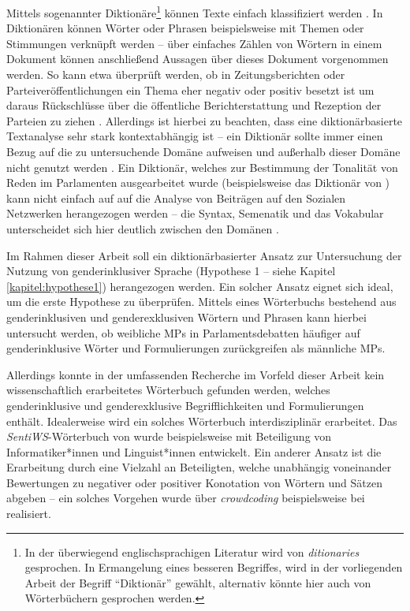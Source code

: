 \documentclass[12pt, 
    twoside=false, 
    bibliography=totoc, 
    numbers=endperiod, 
    headings=normal, 
    toc=chapterentrydotfill
    ]{scrbook}
\begin{document}
Mittels sogenannter Diktionäre\footnote{In der überwiegend englischsprachigen Literatur wird von \emph{ditionaries} gesprochen. In Ermangelung eines besseren Begriffes, wird in der vorliegenden Arbeit der Begriff \enquote{Diktionär} gewählt, alternativ könnte hier auch von Wörterbüchern gesprochen werden.} können Texte einfach klassifiziert werden \parencites[274]{grimmer_2013}[166]{brosius_2012}. In Diktionären können Wörter oder Phrasen beispielsweise mit Themen oder Stimmungen verknüpft werden -- über einfaches Zählen von Wörtern in einem Dokument können anschließend Aussagen über dieses Dokument vorgenommen werden.
So kann etwa überprüft werden, ob in Zeitungsberichten oder Parteiveröffentlichungen ein Thema eher negativ oder positiv besetzt ist um daraus Rückschlüsse über die öffentliche Berichterstattung und Rezeption der Parteien zu ziehen \parencites[vgl.][]{haselmayer_2017}[vgl.][]{backfried_2016}. Allerdings ist hierbei zu beachten, dass eine diktionärbasierte Textanalyse sehr stark kontextabhängig ist -- ein Diktionär sollte immer einen Bezug auf die zu untersuchende Domäne aufweisen und außerhalb dieser Domäne nicht genutzt werden \parencite[268]{grimmer_2013}. Ein Diktionär, welches zur Bestimmung der Tonalität von Reden im Parlamenten ausgearbeitet wurde (beispielsweise das Diktionär von \textcite{haselmayer_2017}) kann nicht einfach auf auf die Analyse von Beiträgen auf den Sozialen Netzwerken herangezogen werden -- die Syntax, Semenatik und das Vokabular unterscheidet sich hier deutlich zwischen den Domänen \parencite[vgl.][534f.]{wilkerson_2017}.

Im Rahmen dieser Arbeit soll ein diktionärbasierter Ansatz zur Untersuchung der Nutzung von genderinklusiver Sprache (Hypothese 1 -- siehe Kapitel \ref{kapitel:hypothese1}) herangezogen werden. Ein solcher Ansatz eignet sich ideal, um die erste Hypothese zu überprüfen. Mittels eines Wörterbuchs bestehend aus genderinklusiven und genderexklusiven Wörtern und Phrasen kann hierbei untersucht werden, ob weibliche MPs in Parlamentsdebatten häufiger auf genderinklusive Wörter und Formulierungen zurückgreifen als männliche MPs.  

Allerdings konnte in der umfassenden Recherche im Vorfeld dieser Arbeit kein wissenschaftlich erarbeitetes Wörterbuch gefunden werden, welches genderinklusive und genderexklusive Begrifflichkeiten und Formulierungen enthält. Idealerweise wird ein solches Wörterbuch interdisziplinär erarbeitet. Das \emph{SentiWS}-Wörterbuch von \textcite{remus_sentiws_2010} wurde beispielsweise mit Beteiligung von Informatiker*innen und Linguist*innen entwickelt. 
Ein anderer Ansatz ist die Erarbeitung durch eine Vielzahl an Beteiligten, welche unabhängig voneinander Bewertungen zu negativer oder positiver Konotation von Wörtern und Sätzen abgeben -- ein solches Vorgehen wurde über \emph{crowdcoding} beispielsweise bei \textcite{haselmayer_2017} realisiert.
\end{document}
